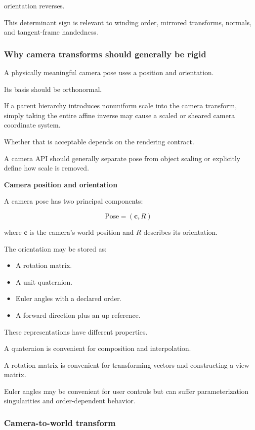 orientation reverses.

This determinant sign is relevant to winding order, mirrored transforms, normals, and tangent-frame handedness.

\subsubsection{Why camera transforms should generally be rigid}\label{why-camera-transforms-should-generally-be-rigid}

A physically meaningful camera pose uses a position and orientation.

Its basis should be orthonormal.

If a parent hierarchy introduces nonuniform scale into the camera transform, simply taking the entire affine inverse may cause a scaled or sheared camera coordinate system.

Whether that is acceptable depends on the rendering contract.

A camera API should generally separate pose from object scaling or explicitly define how scale is removed.

\textbf{Camera position and orientation}

A camera pose has two principal components:

\[
 \boxed{ \text{Pose}=(\mathbf c,R) }
\]

where \(\mathbf c\) is the camera's world position and \(R\) describes its orientation.

The orientation may be stored as:

\begin{itemize}
\tightlist
\item
  A rotation matrix.
\item
  A unit quaternion.
\item
  Euler angles with a declared order.
\item
  A forward direction plus an up reference.
\end{itemize}

These representations have different properties.

A quaternion is convenient for composition and interpolation.

A rotation matrix is convenient for transforming vectors and constructing a view matrix.

Euler angles may be convenient for user controls but can suffer parameterization singularities and order-dependent behavior.

\subsubsection{Camera-to-world transform}\label{camera-to-world-transform}

